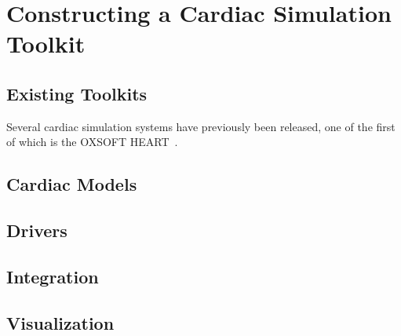 \chapter{Constructing a Cardiac Simulation Toolkit}

\section{Existing Toolkits}

Several cardiac simulation systems have previously been released, one of
the first of which is the OXSOFT HEART~\cite{Noble-1999}.

\section{Cardiac Models}

\section{Drivers}

\section{Integration}

\section{Visualization}

